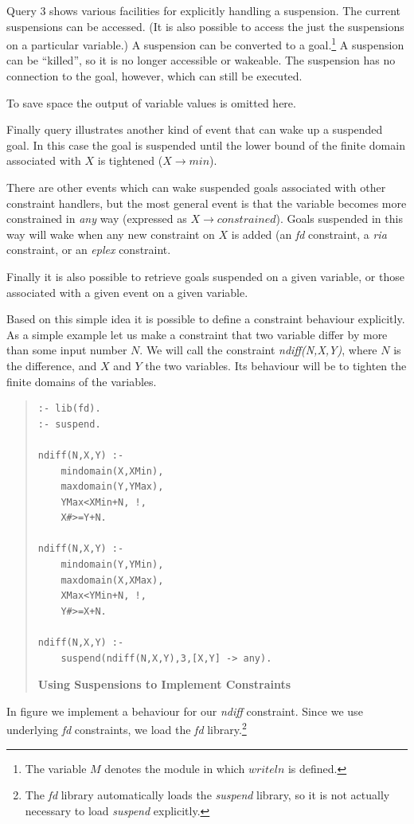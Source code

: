 \documentclass[a4wide]{article}
\begin{document}
Query 3 shows various facilities for explicitly handling a suspension.
The current suspensions can be accessed.
(It is also possible to access the
just the suspensions on a particular variable.)
A suspension can be converted to a goal.\footnote{The variable $M$
denotes the module in which $writeln$ 
is defined.}
A suspension can be ``killed'', so it is no longer accessible or
wakeable.
The suspension has no connection to the goal, however, which can still
be executed.

To save space the output of variable values is omitted
here.

Finally query  illustrates another kind of event that can wake up a
suspended goal.
In this case the goal is suspended until the lower bound of the finite
domain associated with $X$ is tightened ($X \rightarrow min$).

There are other events which can wake suspended goals associated with
other constraint handlers, but the most general event is that the
variable becomes more constrained in {\em any} way (expressed as $X
\rightarrow constrained$).
Goals suspended in this way will wake when any new constraint on $X$
is added (an {\em fd} constraint, a {\em ria} constraint, or an {\em
eplex} 
constraint. 

Finally it is also possible to retrieve goals suspended on a given
variable, or those associated with a given event on a given variable.

Based on this simple idea it is possible to define a constraint
behaviour explicitly.
As a simple example let us make a constraint that two variable differ
by more than some input number $N$.
We will call the constraint {\em ndiff(N,X,Y)}, where $N$ is the
difference, and $X$ and $Y$ the two variables.
Its behaviour will be to tighten the finite domains of the variables.
\begin{quote}
\begin{verbatim}
:- lib(fd).
:- suspend.

ndiff(N,X,Y) :-
    mindomain(X,XMin),
    maxdomain(Y,YMax),
    YMax<XMin+N, !,
    X#>=Y+N.

ndiff(N,X,Y) :-
    mindomain(Y,YMin),
    maxdomain(X,XMax),
    XMax<YMin+N, !,
    Y#>=X+N.
    
ndiff(N,X,Y) :-
    suspend(ndiff(N,X,Y),3,[X,Y] -> any).

\end{verbatim}
{\bf Using Suspensions to Implement Constraints}
\label{suspcons}
\end{quote}
In figure \pageref{suspcons} we implement a behaviour for our {\em ndiff}
constraint.
Since we use underlying {\em fd} constraints, we load the {\em fd}
library.\footnote{The {\em fd} library automatically loads the {\em
suspend} library, so it is not actually necessary to load {\em
suspend} explicitly.}
\end{document}
